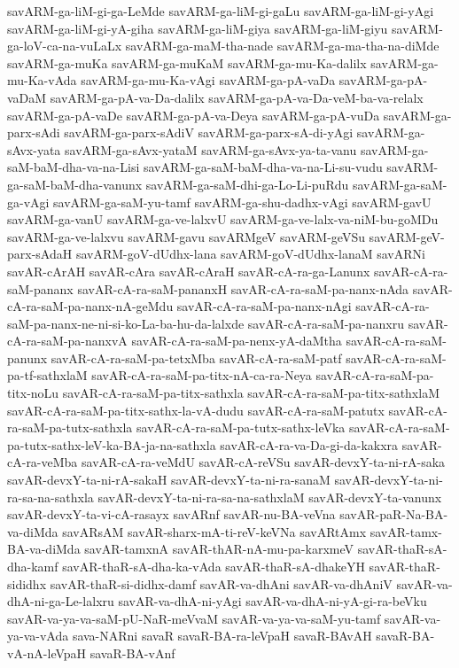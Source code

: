 {savARM-ga-liM-gi-ga-LeMde
savARM-ga-liM-gi-gaLu
savARM-ga-liM-gi-yAgi
savARM-ga-liM-gi-yA-giha
savARM-ga-liM-giya
savARM-ga-liM-giyu
savARM-ga-loV-ca-na-vuLaLx
savARM-ga-maM-tha-nade
savARM-ga-ma-tha-na-diMde
savARM-ga-muKa
savARM-ga-muKaM
savARM-ga-mu-Ka-dalilx
savARM-ga-mu-Ka-vAda
savARM-ga-mu-Ka-vAgi
savARM-ga-pA-vaDa
savARM-ga-pA-vaDaM
savARM-ga-pA-va-Da-dalilx
savARM-ga-pA-va-Da-veM-ba-va-relalx
savARM-ga-pA-vaDe
savARM-ga-pA-va-Deya
savARM-ga-pA-vuDa
savARM-ga-parx-sAdi
savARM-ga-parx-sAdiV
savARM-ga-parx-sA-di-yAgi
savARM-ga-sAvx-yata
savARM-ga-sAvx-yataM
savARM-ga-sAvx-ya-ta-vanu
savARM-ga-saM-baM-dha-va-na-Lisi
savARM-ga-saM-baM-dha-va-na-Li-su-vudu
savARM-ga-saM-baM-dha-vanunx
savARM-ga-saM-dhi-ga-Lo-Li-puRdu
savARM-ga-saM-ga-vAgi
savARM-ga-saM-yu-tamf
savARM-ga-shu-dadhx-vAgi
savARM-gavU
savARM-ga-vanU
savARM-ga-ve-lalxvU
savARM-ga-ve-lalx-va-niM-bu-goMDu
savARM-ga-ve-lalxvu
savARM-gavu
savARMgeV
savARM-geVSu
savARM-geV-parx-sAdaH
savARM-goV-dUdhx-lana
savARM-goV-dUdhx-lanaM
savARNi
savAR-cArAH
savAR-cAra
savAR-cAraH
savAR-cA-ra-ga-Lanunx
savAR-cA-ra-saM-pananx
savAR-cA-ra-saM-pananxH
savAR-cA-ra-saM-pa-nanx-nAda
savAR-cA-ra-saM-pa-nanx-nA-geMdu
savAR-cA-ra-saM-pa-nanx-nAgi
savAR-cA-ra-saM-pa-nanx-ne-ni-si-ko-La-ba-hu-da-lalxde
savAR-cA-ra-saM-pa-nanxru
savAR-cA-ra-saM-pa-nanxvA
savAR-cA-ra-saM-pa-nenx-yA-daMtha
savAR-cA-ra-saM-panunx
savAR-cA-ra-saM-pa-tetxMba
savAR-cA-ra-saM-patf
savAR-cA-ra-saM-pa-tf-sathxlaM
savAR-cA-ra-saM-pa-titx-nA-ca-ra-Neya
savAR-cA-ra-saM-pa-titx-noLu
savAR-cA-ra-saM-pa-titx-sathxla
savAR-cA-ra-saM-pa-titx-sathxlaM
savAR-cA-ra-saM-pa-titx-sathx-la-vA-dudu
savAR-cA-ra-saM-patutx
savAR-cA-ra-saM-pa-tutx-sathxla
savAR-cA-ra-saM-pa-tutx-sathx-leVka
savAR-cA-ra-saM-pa-tutx-sathx-leV-ka-BA-ja-na-sathxla
savAR-cA-ra-va-Da-gi-da-kakxra
savAR-cA-ra-veMba
savAR-cA-ra-veMdU
savAR-cA-reVSu
savAR-devxY-ta-ni-rA-saka
savAR-devxY-ta-ni-rA-sakaH
savAR-devxY-ta-ni-ra-sanaM
savAR-devxY-ta-ni-ra-sa-na-sathxla
savAR-devxY-ta-ni-ra-sa-na-sathxlaM
savAR-devxY-ta-vanunx
savAR-devxY-ta-vi-cA-rasayx
savARnf
savAR-nu-BA-veVna
savAR-paR-Na-BA-va-diMda
savARsAM
savAR-sharx-mA-ti-reV-keVNa
savARtAmx
savAR-tamx-BA-va-diMda
savAR-tamxnA
savAR-thAR-nA-mu-pa-karxmeV
savAR-thaR-sA-dha-kamf
savAR-thaR-sA-dha-ka-vAda
savAR-thaR-sA-dhakeYH
savAR-thaR-sididhx
savAR-thaR-si-didhx-damf
savAR-va-dhAni
savAR-va-dhAniV
savAR-va-dhA-ni-ga-Le-lalxru
savAR-va-dhA-ni-yAgi
savAR-va-dhA-ni-yA-gi-ra-beVku
savAR-va-ya-va-saM-pU-NaR-meVvaM
savAR-va-ya-va-saM-yu-tamf
savAR-va-ya-va-vAda
sava-NARni
savaR
savaR-BA-ra-leVpaH
savaR-BAvAH
savaR-BA-vA-nA-leVpaH
savaR-BA-vAnf
}
